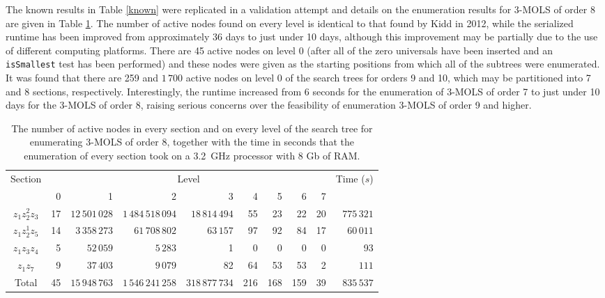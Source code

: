 \documentclass[11pt, a4paper]{article}
\newcommand{\iis}{\texttt{isSmallest} }
\newcounter{ls}
\begin{document}
The known results in Table \ref{known} were replicated in a validation attempt and details on the enumeration results for $3$-MOLS of order 8 are given in Table \ref{83}. The number of active nodes found  on every level is identical to that found by Kidd \cite{Kidd2012} in 2012, while the serialized runtime has been improved from approximately 36 days to just under 10 days, although this improvement may be partially due to the use of different computing platforms. There are 45 active nodes on level 0 (after all of the zero universals have been inserted  and an \iis test has been performed) and these nodes were given as the starting positions from which all of the subtrees were enumerated. It was found that there are 259 and $1\,700$ active nodes on level 0 of the search trees for orders 9 and 10, which may be partitioned into 7 and 8 sections, respectively. Interestingly, the runtime increased from 6 seconds for the enumeration of $3$-MOLS of order 7 to just under 10 days for the $3$-MOLS of order  8, raising serious concerns over the feasibility of enumeration $3$-MOLS of order 9 and higher. 

 \begin{table}[h]
 \centering
\begin{tabular}{crrrrrrrrr}
\toprule
Section& \multicolumn{8}{c}{Level}& Time ($s$)\\
\cmidrule(lr){2-9}
 & 0 & 1 & 2 & 3 & 4 & 5 & 6 & 7 &   \\ \midrule 
$z_1z_2^2z_3$ &17 & $12\,501\,028$ & $1\,484\,518\,094$ & $18\,814\,494$ & 55 & 23 & 22 & 20 & $775\,321$ \\ 
$z_1z_2^1z_5$ &14 & $3\,358\,273$ & $61\,708\,802$ & $63\,157$ & 97 & 92 & 84 & 17 & $60\,011$ \\ 
$z_1z_3z_4$ &5 & $52\,059$ & $5\,283$ & 1 & 0 & 0 & 0 & 0 & 93 \\ 
$z_1z_7$ &9 & $37\,403$ & $9\,079$ & 82 & 64 & 53 & 53 & 2 & $111$ \\ \midrule
Total &45 & $15\,948\,763$ & $1\,546\,241\,258$ & $318\,877\,734$ & 216 & 168 & 159 & 39 & $835\,537$ \\ \bottomrule
\end{tabular}\vspace*{.4cm}
\caption{The number of active nodes in every section and on every level of the search tree for enumerating   3-MOLS of order 8, together with the time in seconds that the enumeration of every section took on a 3.2~GHz processor with 8 Gb of RAM.}
\label{83}
\end{table}
\end{document}
